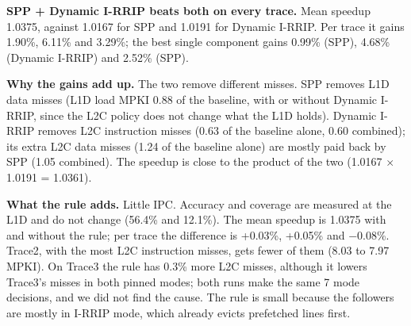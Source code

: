 \textbf{SPP + Dynamic I-RRIP beats both on every trace.} Mean speedup 1.0375, against 1.0167 for SPP and 1.0191 for Dynamic I-RRIP. Per trace it gains 1.90\%, 6.11\% and 3.29\%; the best single component gains 0.99\% (SPP), 4.68\% (Dynamic I-RRIP) and 2.52\% (SPP).

\textbf{Why the gains add up.} The two remove different misses. SPP removes L1D data misses (L1D load MPKI 0.88 of the baseline, with or without Dynamic I-RRIP, since the L2C policy does not change what the L1D holds). Dynamic I-RRIP removes L2C instruction misses (0.63 of the baseline alone, 0.60 combined); its extra L2C data misses (1.24 of the baseline alone) are mostly paid back by SPP (1.05 combined). The speedup is close to the product of the two (1.0167 $\times$ 1.0191 = 1.0361).

\textbf{What the rule adds.} Little IPC. Accuracy and coverage are measured at the L1D and do not change (56.4\% and 12.1\%). The mean speedup is 1.0375 with and without the rule; per trace the difference is +0.03\%, +0.05\% and $-$0.08\%. Trace2, with the most L2C instruction misses, gets fewer of them (8.03 to 7.97 MPKI). On Trace3 the rule has 0.3\% more L2C misses, although it lowers Trace3's misses in both pinned modes; both runs make the same 7 mode decisions, and we did not find the cause. The rule is small because the followers are mostly in I-RRIP mode, which already evicts prefetched lines first.
